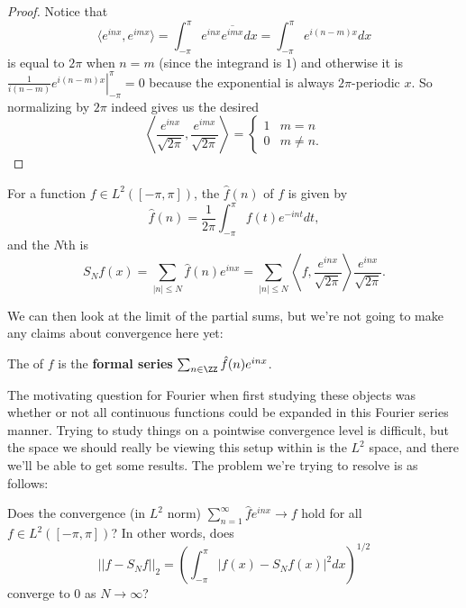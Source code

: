 \begin{proof}
Notice that 
\[
    \langle e^{inx}, e^{imx} \rangle = \int_{-\pi}^{\pi} e^{inx} \overline{e^{imx}} dx = \int_{-\pi}^{\pi} e^{i(n-m)x} dx 
\]
is equal to $2\pi$ when $ n = m$ (since the integrand is $1$) and otherwise it is
$\left.\frac{1}{i(n-m)} e^{i(n-m)x}\right|^\pi_{-\pi} = 0$ because the exponential is always $2\pi$-periodic $x$. So normalizing by $2\pi$ indeed gives us the desired 
\[
    \left\langle \frac{e^{inx}}{\sqrt{2\pi}}, \frac{e^{imx}}{\sqrt{2\pi}}\right\rangle = \begin{cases} 1 & m = n \\ 0 & m \ne n. \end{cases}
\]
\end{proof}

\begin{definition}
For a function $f \in L^2([-\pi, \pi])$, the  $\hat{f}(n)$ of $f$ is given by 
\[
    \hat{f}(n) = \frac{1}{2\pi} \int_{-\pi}^{\pi} f(t) e^{-int} dt,
\]
and the $N$th  is 
\[
    S_N f(x) = \sum_{|n| \le N} \hat{f}(n) e^{inx} = \sum_{|n| \le N} \left\langle f, \frac{e^{inx}}{\sqrt{2\pi}} \right\rangle \frac{e^{inx}}{\sqrt{2\pi}}.
\]
\end{definition}

We can then look at the limit of the partial sums, but we're not going to make any claims about convergence here yet:

\begin{definition}
The  of $f$ is the \textbf{formal series} $\sum_{n \in \ZZ} \hat{f}(n) e^{inx}$.
\end{definition}

The motivating question for Fourier when first studying these objects was whether or not all continuous functions could be expanded in this Fourier series manner. Trying to study things on a pointwise convergence level is difficult, but the space we should really be viewing this setup within is the $L^2$ space, and there we'll be able to get some results. The problem we're trying to resolve is as follows: 

\begin{problem}
Does the convergence (in $L^2$ norm) $\sum_{n=1}^{\infty} \hat{f} e^{inx} \to f$ hold for all $f \in L^2([-\pi, \pi])$? In other words, does 
\[
    ||f - S_N f||_2 = \left(\int_{-\pi}^{\pi} |f(x) - S_Nf(x)|^2 dx \right)^{1/2}
\]
converge to $0$ as $N \to \infty$?
\end{problem}

